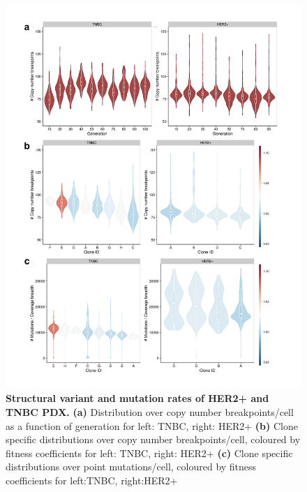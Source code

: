 \begin{figure}
\centering
\includegraphics[width=\textwidth]{Figures/chap4/mutationanalysisbreakpoints.pdf}
  \caption[Structural variant and mutation rates of HER2+ and TNBC PDX]
	{\small
	\textbf{Structural variant and mutation rates of HER2+ and TNBC PDX.}
	    \textbf{(a)} Distribution over copy number
breakpoints/cell as a function of generation for left: TNBC, right: HER2+
   \textbf{(b)} Clone specific distributions over copy number breakpoints/cell, coloured by fitness coefficients for left: TNBC, right: HER2+
    \textbf{(c)} Clone specific distributions over point mutations/cell, coloured by fitness coefficients for left:TNBC, right:HER2+
}
    \label{fig:mutationanalysisbreakpoints}
    \end{figure}

